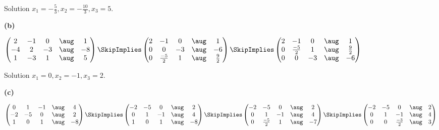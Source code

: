 \documentclass[oneside,12pt]{amsart}
\begin{document}
\bigskip

Solution $x_1=-\frac{5}{3}, x_2=-\frac{10}{3}, x_3=5$.

\bigskip


\textbf{(b)}

\bigskip

$
\begin{pmatrix}
2 & -1 & 0  & \aug & 1 \\
-4 & 2 & -3 & \aug & -8 \\
1 & -3 & 1  & \aug & 5 \\
\end{pmatrix}
\SkipImplies
\begin{pmatrix}
2 & -1 & 0 &            \aug &   1 \\
0 & 0 & -3 &            \aug &  -6 \\
0 & \frac{-5}{2} & 1 &  \aug &  \frac{9}{2} \\
\end{pmatrix}
\SkipImplies
\begin{pmatrix}
2 & -1 & 0 &            \aug &   1 \\
0 & \frac{-5}{2} & 1 &  \aug &  \frac{9}{2} \\
0 & 0 & -3 &            \aug &  -6 \\
\end{pmatrix}
$

\bigskip

Solution $x_1=0, x_2=-1, x_3=2$.


\textbf{(c)}

\bigskip

$
\begin{pmatrix}
0 & 1 & -1 &  \aug &  4 \\
-2 & -5 & 0 & \aug &  2 \\
1 & 0 & 1 &   \aug & -8 \\
\end{pmatrix}
\SkipImplies
\begin{pmatrix}
-2 & -5 & 0 & \aug &  2 \\
 0 & 1 & -1 & \aug &  4 \\
1 & 0 & 1 &   \aug & -8 \\
\end{pmatrix}
\SkipImplies
\begin{pmatrix}
-2 & -5 & 0 &           \aug &  2 \\
0 & 1 & -1 &            \aug &  4 \\
0 & \frac{-5}{2} & 1 &  \aug &  -7
\end{pmatrix}
\SkipImplies
\begin{pmatrix}
-2 & -5 & 0 &            \aug &   2 \\
0 & 1 & -1 &             \aug &  4 \\
0 & 0 & \frac{-3}{2} &   \aug &  3
\end{pmatrix}
$
\end{document}
